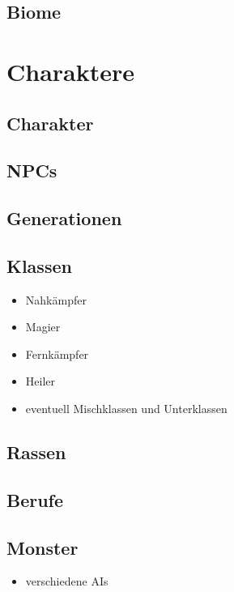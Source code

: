 \subsection{Biome}
\label{subsec:biome}

\section{Charaktere}
\label{sec:charaktere}

\subsection{Charakter}
\label{subsec:charakter}

\subsection{NPCs}
\label{subsec:NPCs}

\subsection{Generationen}
\label{subsec:generationen}

\subsection{Klassen}
\label{subsec:klassen}

\begin{itemize}
	\item Nahkämpfer
	\item Magier
	\item Fernkämpfer
	\item Heiler
	\item eventuell Mischklassen und Unterklassen
\end{itemize}

\subsection{Rassen}
\label{subsec:rassen}

\subsection{Berufe}
\label{subsec:berufe}

\subsection{Monster}
\label{subsec:monster}
\begin{itemize}
	\item verschiedene AIs
\end{itemize}

